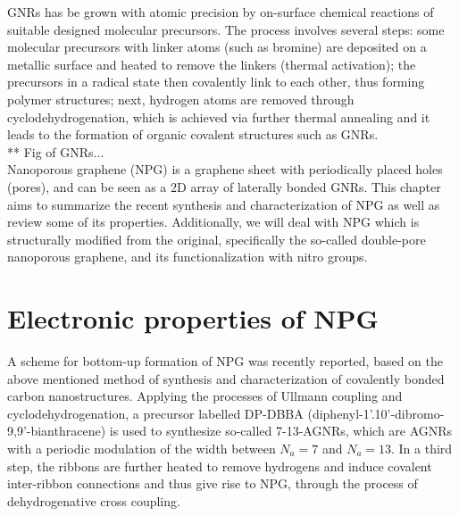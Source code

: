 GNRs has be grown with atomic precision by on-surface chemical reactions of suitable
designed molecular precursors\parencite{Cai2010, Kretz2018}. The process involves several steps\parencite{Grill2007, Cai2010}: some molecular precursors with linker atoms (such as bromine) are deposited on a metallic surface and  heated to remove the linkers (thermal activation); the precursors in a radical state then covalently link to each other, thus forming polymer structures; next, hydrogen atoms are removed through cyclodehydrogenation, which is achieved via further thermal annealing and it leads to the formation of organic covalent structures such as GNRs.\\

** Fig of GNRs...\\

Nanoporous graphene (NPG) is a graphene sheet with periodically placed holes (pores), and can be seen as a 2D array of laterally bonded GNRs. This chapter aims to summarize the recent synthesis and characterization\parencite{Moreno2018} of NPG as well as review some of its properties. Additionally, we will deal with NPG which is structurally modified from the original, specifically the so-called double-pore nanoporous graphene, and its functionalization with nitro groups.


\section{Electronic properties of NPG}\label{ele-npg}

A scheme for bottom-up formation of NPG was recently reported\parencite{Moreno2018, Kretz2018}, based on the above mentioned method of synthesis and characterization of covalently bonded carbon nanostructures.
Applying the processes of Ullmann coupling and cyclodehydrogenation, a precursor labelled DP-DBBA (diphenyl-1'.10'-dibromo-9,9'-bianthracene) is used to synthesize so-called 7-13-AGNRs, which are AGNRs with a periodic modulation of the width between \(N_a=7\) and \(N_a=13\). In a third step, the ribbons are further heated to remove hydrogens and induce covalent inter-ribbon connections and thus give rise to NPG, through the process of dehydrogenative cross coupling.\\

